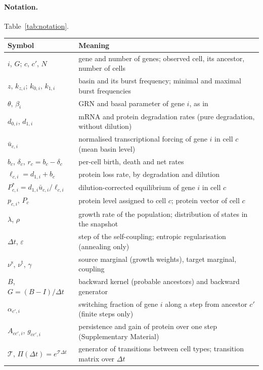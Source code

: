 \documentclass[a4paper, 11pt]{article}
\newcommand{\Tg}{\mathcal{T}}
\theoremstyle{plain}
\theoremstyle{remark}
\begin{document}
\paragraph{Notation.} Table~\ref{tab:notation}.

\begin{table}[!t]
\centering
\small
\begin{tabular}{p{4.2cm}p{10.6cm}}
\toprule
Symbol & Meaning \\
\midrule
$i$, $G$; $c$, $c'$, $N$ & gene and number of genes; observed cell, its ancestor, number of cells \\
$z$, $k_{z,i}$; $k_{0,i}$, $k_{1,i}$ & basin and its burst frequency; minimal and maximal burst frequencies \\
$\theta$, $\beta_i$ & GRN and basal parameter of gene $i$, as in~\cite{mauge2026cardamomot} \\
$d_{0,i}$, $d_{1,i}$ & mRNA and protein degradation rates (pure degradation, without dilution) \\
$\bar u_{c,i}$ & normalised transcriptional forcing of gene $i$ in cell $c$ (mean basin level) \\
$b_c$, $\delta_c$, $r_c = b_c - \delta_c$ & per-cell birth, death and net rates \\
$\ell_{c,i} = d_{1,i} + b_c$ & protein loss rate, by degradation and dilution \\
$P^\ast_{c,i} = d_{1,i}\bar u_{c,i}/\ell_{c,i}$ & dilution-corrected equilibrium of gene $i$ in cell $c$ \\
$p_{c,i}$, $P_c$ & protein level assigned to cell $c$; protein vector of cell $c$ \\
$\lambda$, $\rho$ & growth rate of the population; distribution of states in the snapshot \\
$\Delta t$, $\varepsilon$ & step of the self-coupling; entropic regularisation (annealing only) \\
$\nu^{\mathrm{s}}$, $\nu^{\mathrm{t}}$, $\gamma$ & source marginal (growth weights), target marginal, coupling \\
$B$, $G = (B - I)/\Delta t$ & backward kernel (probable ancestors) and backward generator \\
$\alpha_{c',i}$ & switching fraction of gene $i$ along a step from ancestor $c'$ (finite steps only) \\
$A_{cc',i}$, $g_{cc',i}$ & persistence and gain of protein over one step (Supplementary Material) \\
$\Tg$, $\Pi(\Delta t) = e^{\Tg\Delta t}$ & generator of transitions between cell types; transition matrix over $\Delta t$ \\

\end{tabular}
\end{table}
\end{document}
